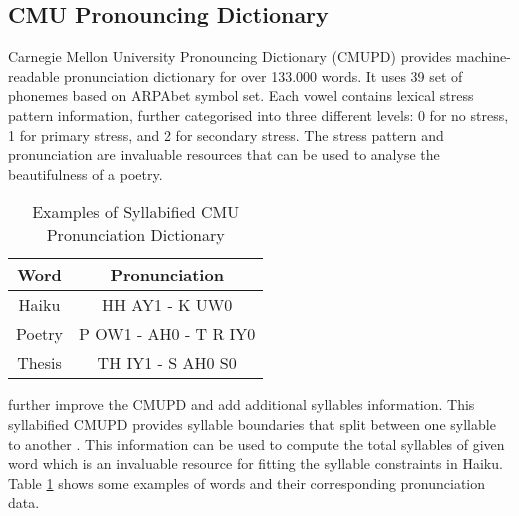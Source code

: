 \subsection{CMU Pronouncing Dictionary}


Carnegie Mellon University Pronouncing Dictionary (CMUPD) provides machine-readable pronunciation dictionary for over 133.000 words. It uses 39 set of phonemes based on ARPAbet symbol set. Each vowel contains lexical stress pattern information, further categorised into three different levels: 0 for no stress, 1 for primary stress, and 2 for secondary stress\cite{CMUDict}. The stress pattern and pronunciation are invaluable resources that can be used to analyse the beautifulness of a poetry.


\begin{table}[h]

\centering


\begin{tabular}{|c|c|}

\hline  \textbf{Word} & \textbf{Pronunciation} \\ 

\hline Haiku  & HH AY1 - K UW0\\

\hline Poetry  & P OW1 - AH0 - T R IY0 \\

\hline Thesis  &  TH IY1 - S AH0 S0 \\

\hline

\end{tabular} 


\caption{Examples of Syllabified CMU Pronunciation Dictionary}

\label{Sylla}

\end{table}


\citeauthor{bartlett2009syllabification} further improve the CMUPD and add additional syllables information. This syllabified CMUPD provides syllable boundaries that split between one syllable to another \cite{bartlett2009syllabification}. This information can be used to compute the total syllables of given word which is an invaluable resource for fitting the syllable constraints in Haiku. Table \ref{Sylla} shows some examples of words and their corresponding pronunciation data.